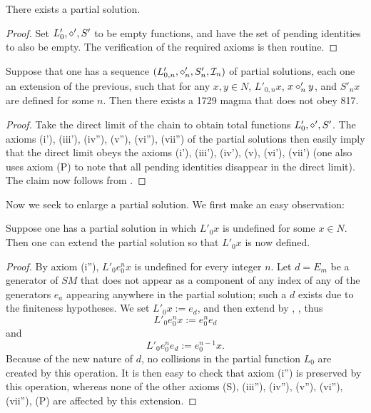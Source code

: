 \begin{lemma}\label{partial-exist}  There exists a partial solution.
\end{lemma}

\begin{proof} Set $L'_0, \diamond', S'$ to be empty functions, and have the set of pending identities to also be empty.  The verification of the required axioms is then routine.
\end{proof}

\begin{lemma}\label{chain}  Suppose that one has a sequence
$(L'_{0,n}, \diamond'_{n}, S'_{n}, {\mathcal I}_n)$ of partial solutions, each one an extension of the previous, such that for any $x, y \in N$, $L'_{0,n} x$, $x \diamond'_{n} y$, and $S'_n x$ are defined for some $n$.  Then there exists a 1729 magma that does not obey 817.
\end{lemma}

\begin{proof}  Take the direct limit of the chain to obtain total functions $L'_0, \diamond', S'$.  The axioms (i'), (iii'), (iv''), (v''), (vi''), (vii'') of the partial solutions then easily imply that the direct limit obeys the axioms (i'), (iii'), (iv'), (v), (vi'), (vii') (one also uses axiom (P) to note that all pending identities disappear in the direct limit). The claim now follows from .
\end{proof}


Now we seek to enlarge a partial solution. We first make an easy observation:

\begin{proposition}[Enlarging $L'_0$]\label{enlarge-l0}  Suppose one has a partial solution in which $L'_0 x$ is undefined for some $x \in N$.  Then one can extend the partial solution so that $L'_0 x$ is now defined.
\end{proposition}

\begin{proof}  By axiom (i''), $L'_0 e_0^n x$ is undefined for every integer $n$.  Let $d = E_m$ be a generator of $SM$ that does not appear as a component of any index of any of the generators $e_a$ appearing anywhere in the partial solution; such a $d$ exists due to the finiteness hypotheses.  We set $L'_0 x := e_d$, and then extend by , , thus
$$L'_0 e_0^n x := e_0^n e_d$$
and
$$L'_0 e_0^n e_d := e_0^{n-1} x.$$
Because of the new nature of $d$, no collisions in the partial function $L_0$ are created by this operation.  It is then easy to check that axiom (i'') is preserved by this operation, whereas none of the other axioms (S), (iii''), (iv''), (v''), (vi''), (vii''), (P) are affected by this extension.
\end{proof}

